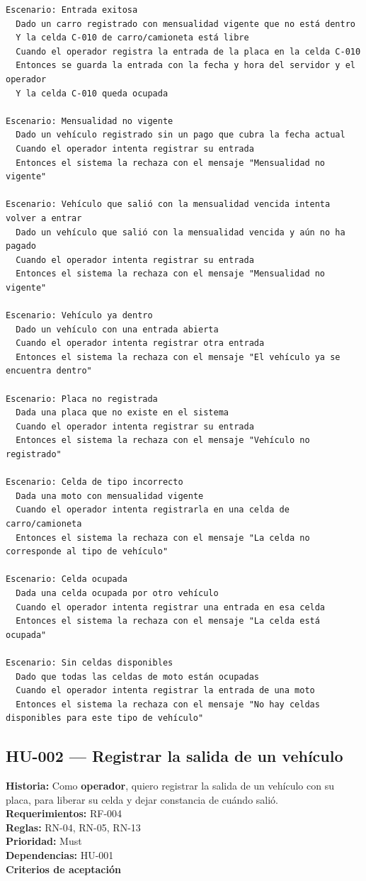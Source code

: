 \begin{lstlisting}[style=gherkin]
Escenario: Entrada exitosa
  Dado un carro registrado con mensualidad vigente que no está dentro
  Y la celda C-010 de carro/camioneta está libre
  Cuando el operador registra la entrada de la placa en la celda C-010
  Entonces se guarda la entrada con la fecha y hora del servidor y el operador
  Y la celda C-010 queda ocupada

Escenario: Mensualidad no vigente
  Dado un vehículo registrado sin un pago que cubra la fecha actual
  Cuando el operador intenta registrar su entrada
  Entonces el sistema la rechaza con el mensaje "Mensualidad no vigente"

Escenario: Vehículo que salió con la mensualidad vencida intenta volver a entrar
  Dado un vehículo que salió con la mensualidad vencida y aún no ha pagado
  Cuando el operador intenta registrar su entrada
  Entonces el sistema la rechaza con el mensaje "Mensualidad no vigente"

Escenario: Vehículo ya dentro
  Dado un vehículo con una entrada abierta
  Cuando el operador intenta registrar otra entrada
  Entonces el sistema la rechaza con el mensaje "El vehículo ya se encuentra dentro"

Escenario: Placa no registrada
  Dada una placa que no existe en el sistema
  Cuando el operador intenta registrar su entrada
  Entonces el sistema la rechaza con el mensaje "Vehículo no registrado"

Escenario: Celda de tipo incorrecto
  Dada una moto con mensualidad vigente
  Cuando el operador intenta registrarla en una celda de carro/camioneta
  Entonces el sistema la rechaza con el mensaje "La celda no corresponde al tipo de vehículo"

Escenario: Celda ocupada
  Dada una celda ocupada por otro vehículo
  Cuando el operador intenta registrar una entrada en esa celda
  Entonces el sistema la rechaza con el mensaje "La celda está ocupada"

Escenario: Sin celdas disponibles
  Dado que todas las celdas de moto están ocupadas
  Cuando el operador intenta registrar la entrada de una moto
  Entonces el sistema la rechaza con el mensaje "No hay celdas disponibles para este tipo de vehículo"
\end{lstlisting}

\subsection{HU-002 — Registrar la salida de un vehículo}
\textbf{Historia:} Como \textbf{operador}, quiero registrar la salida de un vehículo con su placa, para liberar su celda y dejar constancia de cuándo salió.\\
\textbf{Requerimientos:} RF-004\\
\textbf{Reglas:} RN-04, RN-05, RN-13\\
\textbf{Prioridad:} Must\\
\textbf{Dependencias:} HU-001\\
\textbf{Criterios de aceptación}

